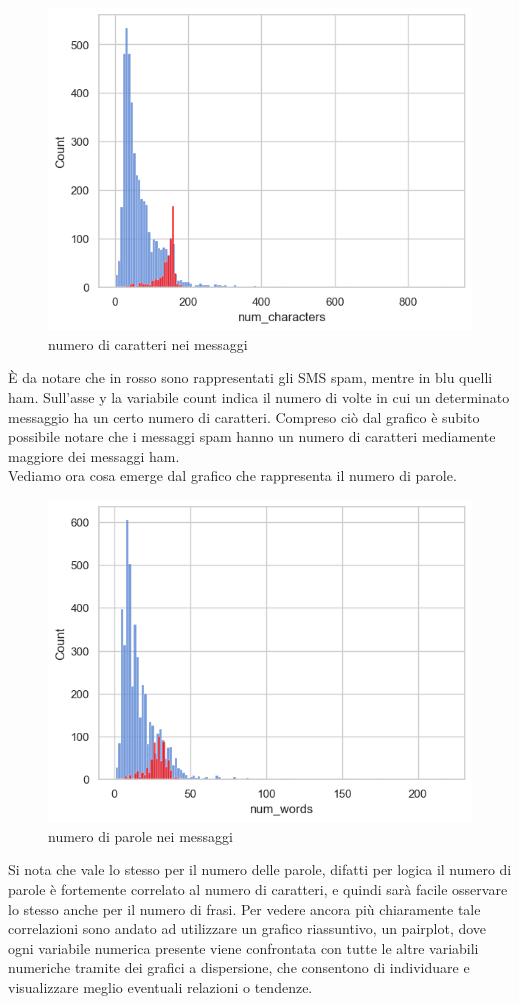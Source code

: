 \documentclass[]{article}
\begin{document}
        \begin{figure}[H]
            \centering
            \includegraphics[width=0.6\linewidth]{images/num_char.png}
            \caption{numero di caratteri nei messaggi}
            \label{fig:enter-label}
        \end{figure}

        È da notare che in rosso sono rappresentati gli SMS spam, mentre in blu quelli ham. Sull'asse y la variabile count indica il numero di volte in cui un determinato messaggio ha un certo numero di caratteri. Compreso ciò dal grafico è subito possibile notare che i messaggi spam hanno un numero di caratteri mediamente maggiore dei messaggi ham. \\
        Vediamo ora cosa emerge dal grafico che rappresenta il numero di parole.\\

        \begin{figure}[H]
            \centering
            \includegraphics[width=0.6\linewidth]{images/num_words.png}
            \caption{numero di parole nei messaggi}
            \label{fig:enter-label}
        \end{figure}

        Si nota che vale lo stesso per il numero delle parole, difatti per logica il numero di parole è fortemente correlato al numero di caratteri, e quindi sarà facile osservare lo stesso anche per il numero di frasi. Per vedere ancora più chiaramente tale correlazioni sono andato ad utilizzare un grafico riassuntivo, un pairplot, dove ogni variabile numerica presente viene confrontata con tutte le altre variabili numeriche tramite dei grafici a dispersione, che consentono di individuare e visualizzare meglio eventuali relazioni o tendenze.
\end{document}
